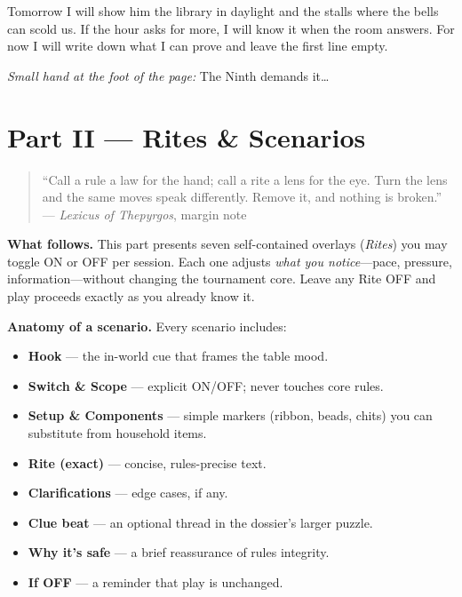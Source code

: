 \documentclass[11pt]{article}
\begin{document}
\medskip
Tomorrow I will show him the library in daylight and the stalls where the bells can scold us. If the hour asks for more, I will know it when the room answers. For now I will write down what I can prove and leave the first line empty.

\medskip
\noindent\textit{Small hand at the foot of the page:} The Ninth demands it\ldots{}
\clearpage
\section{Part II — Rites \& Scenarios}
\label{part:rites}
{}

\begin{quote}\small
``Call a rule a law for the hand; call a rite a lens for the eye.  
Turn the lens and the same moves speak differently. Remove it, and nothing is broken.''\\
\hfill — \textit{Lexicus of Thepyrgos}, margin note
\end{quote}

\noindent\textbf{What follows.} This part presents seven self-contained overlays (\emph{Rites}) you may toggle \textsc{ON} or \textsc{OFF} per session. Each one adjusts \textit{what you notice}—pace, pressure, information—without changing the tournament core. Leave any Rite \textsc{OFF} and play proceeds exactly as you already know it.

\medskip
\noindent\textbf{Anatomy of a scenario.} Every scenario includes:
\begin{itemize}\setlength\itemsep{0.3em}
  \item \textbf{Hook} — the in-world cue that frames the table mood.
  \item \textbf{Switch \& Scope} — explicit \textsc{ON/OFF}; never touches core rules.
  \item \textbf{Setup \& Components} — simple markers (ribbon, beads, chits) you can substitute from household items.
  \item \textbf{Rite (exact)} — concise, rules-precise text.
  \item \textbf{Clarifications} — edge cases, if any.
  \item \textbf{Clue beat} — an optional thread in the dossier’s larger puzzle.
  \item \textbf{Why it’s safe} — a brief reassurance of rules integrity.
  \item \textbf{If \textsc{OFF}} — a reminder that play is unchanged.
\end{itemize}
\end{document}
